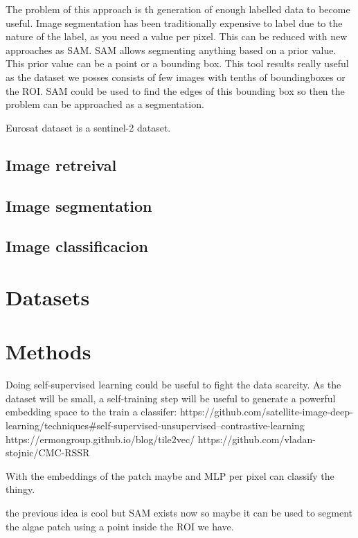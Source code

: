 \documentclass[conference]{IEEEtran}
\begin{document}
    The problem of this approach is th generation of enough labelled data to become useful.
    Image segmentation has been traditionally expensive to label due to the nature of the label, as
    you need a value per pixel.
    This can be reduced with new approaches as SAM. SAM allows segmenting anything based on a prior
    value. This prior value can be a point or a bounding box. This tool results really useful as
    the dataset we posses consists of few images with tenths of boundingboxes or the ROI.
    SAM could be used to find the edges of this bounding box so then the problem can be approached
    as a segmentation.

    Eurosat dataset\cite{helber2019eurosat} is a sentinel-2 dataset.

    \subsection{Image retreival}

    \subsection{Image segmentation}

    \subsection{Image classificacion}


    \section{Datasets}


    \section{Methods}

    Doing self-supervised learning could be useful to fight the data scarcity.\cite{OKELLY1987393}
    As the dataset will be small, a self-training step will be useful to generate
    a powerful embedding space to the train a classifer:
    https://github.com/satellite-image-deep-learning/techniques#self-supervised-unsupervised--contrastive-learning
    https://ermongroup.github.io/blog/tile2vec/
    https://github.com/vladan-stojnic/CMC-RSSR

    With the embeddings of the patch maybe and MLP per pixel can classify the thingy.


    the previous idea is cool but SAM exists now so maybe it can be used to segment the algae patch
    using a point inside the ROI we have.
\end{document}
